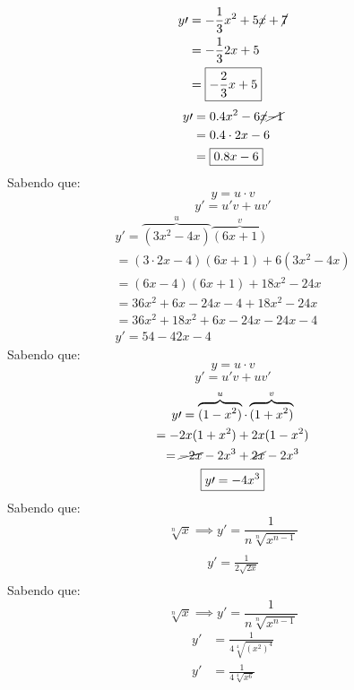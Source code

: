 \documentclass{jhwhw}
\begin{document}
\begin{align*}
    y\prime & = -\frac{1}{3} x^2 + 5\cancel{x} + \cancel{7} \\
            & = -\frac{1}{3} 2x + 5                         \\
            & = \boxed{-\frac{2}{3} x + 5}
\end{align*}
\begin{align*}
    y\prime & = 0.4 x^2 -6\cancel{x} \cancel{-1} \\
            & = 0.4\cdot2x -6                    \\
            & = \boxed{0.8x - 6}
\end{align*}
Sabendo que:
\[
    y = u \cdot v
\]
\[
    y\prime = u\prime v + u v\prime
\]
\begin{multline*}
    y\prime = \overbrace{(3x^2 - 4x)}^{u}\overbrace{(6x+1)}^{v} \\
    = (3 \cdot 2x - 4)(6x+1) + 6(3x^2-4x) \\
    = (6x-4)(6x+1) + 18x^2 - 24x \\
    = 36x^2 + 6x -24x - 4 + 18x^2 - 24x \\
    = 36x^2 + 18x^2 +6x - 24x - 24x - 4 \\
    \boxed{y\prime = 54 - 42x - 4}
\end{multline*}
Sabendo que: \[
    y = u \cdot v\]\[
    y\prime = u\prime v + u v\prime
\]
\begin{multline*}
    y\prime = \overbrace{(1-x^2)}^{u} \cdot \overbrace{(1+x^2)}^{v} \\
    = -2x(1+x^2) + 2x(1-x^2) \\
    = \cancel{-2x} - 2x^3 + \cancel{2x} - 2x^3 \\
    \boxed{y\prime= -4x^3}
\end{multline*}
Sabendo que: \[
    \sqrt[n]{x} \implies y\prime = \frac{1}{n\sqrt[n]{x^{n-1}}}
\]
\begin{multline*}
    \\\boxed{y\prime = \frac{1}{2\sqrt{2x}}}\\
\end{multline*}
Sabendo que: \[
    \sqrt[n]{x} \implies y\prime = \frac{1}{n\sqrt[n]{x^{n-1}}}
\]
\begin{align*}
    y\prime &= \frac{1}{4\sqrt[4]{(x^2)^{4}}}\\
    y\prime &= \frac{1}{4\sqrt[4]{x^6}}
\end{align*}
\newpage
\reset
\end{document}
